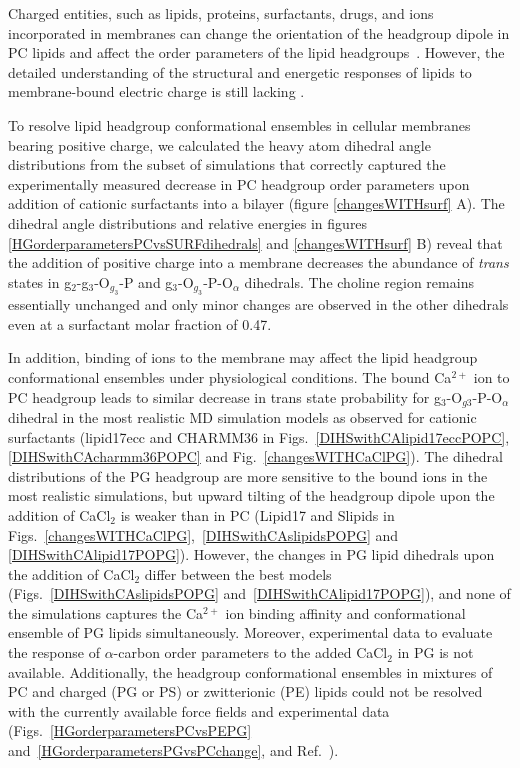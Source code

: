 \documentclass[aps,prl,superscriptaddress,twocolumn]{revtex4}
\begin{document}
Charged entities, such as lipids, proteins, surfactants, drugs, and ions incorporated in membranes can change the orientation of the headgroup dipole in PC lipids and affect the order parameters of the lipid headgroups~\cite{seelig87}. However, the detailed understanding of the structural and energetic responses of lipids to membrane-bound electric charge is still lacking \cite{Semchyschyn04}.

To resolve lipid headgroup conformational ensembles in cellular membranes bearing positive charge,
we calculated the heavy atom dihedral angle distributions from 
the subset of simulations %
that correctly captured the experimentally measured decrease in PC headgroup order parameters upon addition of cationic surfactants into a bilayer (figure \ref{changesWITHsurf} A).
The dihedral angle distributions and relative energies
in figures \ref{HGorderparametersPCvsSURFdihedrals} and \ref{changesWITHsurf} B) reveal that the
addition of positive charge into a membrane 
decreases the abundance of \textit{trans} states in g$_2$-g$_3$-O$_{g_3}$-P and g$_3$-O$_{g_3}$-P-O$_\alpha$
dihedrals.
The choline region remains essentially unchanged and only minor changes are observed in the other dihedrals even at a surfactant molar fraction of 0.47.

In addition, binding of ions to the membrane may affect the lipid headgroup conformational ensembles under physiological conditions.
The bound Ca$^{2+}$ ion to PC headgroup leads to similar decrease in trans state probability for g$_3$-O$_{g3}$-P-O$_\alpha$ dihedral
in the most realistic MD simulation models
as observed for cationic surfactants
(lipid17ecc and CHARMM36 in Figs.~\ref{DIHSwithCAlipid17eccPOPC}, \ref{DIHSwithCAcharmm36POPC} and Fig.~\ref{changesWITHCaClPG}).
The dihedral distributions of the PG headgroup are more sensitive to the bound ions in the most realistic simulations,
but upward tilting of the headgroup dipole upon the addition of CaCl$_2$ is weaker than in PC
(Lipid17 and Slipids in Figs.~\ref{changesWITHCaClPG},~\ref{DIHSwithCAslipidsPOPG} and \ref{DIHSwithCAlipid17POPG}).
However, the changes in PG lipid dihedrals upon the addition of CaCl$_2$ differ between the best models (Figs.~\ref{DIHSwithCAslipidsPOPG} and~\ref{DIHSwithCAlipid17POPG}), and none of the simulations captures the Ca$^{2+}$ ion binding affinity and conformational ensemble of PG lipids simultaneously. Moreover, experimental data to evaluate the response of $\alpha$-carbon order parameters to the added CaCl$_2$ in PG is not available.
Additionally, the headgroup conformational ensembles in mixtures of PC and charged (PG or PS) or zwitterionic (PE)
lipids could not be resolved with the currently available force fields and experimental data
(Figs.~\ref{HGorderparametersPCvsPEPG} and~\ref{HGorderparametersPGvsPCchange}, and Ref.~\cite{melcrova16,antila19,melcr20}).
\end{document}
